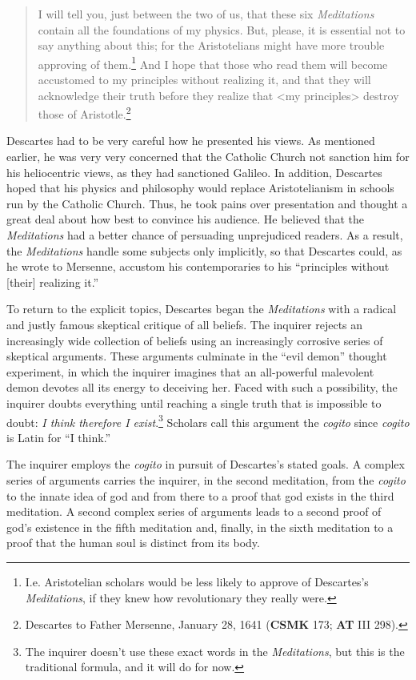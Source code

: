 \begin{quote}
    I will tell you, just between the two of us, that these six \textit{Meditations} contain all the foundations of my physics. But, please, it is essential not to say anything about this; for the Aristotelians might have more trouble approving of them.\footnote{I.e. Aristotelian scholars would be less likely to approve of Descartes's \textit{Meditations}, if they knew how revolutionary they really were.} And I hope that those who read them will become accustomed to my principles without realizing it, and that they will acknowledge their truth before they realize that <my principles> destroy those of Aristotle.\footnote{Descartes to Father Mersenne, January 28, 1641 (\textbf{CSMK} 173; \textbf{AT} III 298).}
\end{quote}

Descartes had to be very careful how he presented his views. As mentioned earlier, he was very very concerned that the Catholic Church not sanction him for his heliocentric views, as they had sanctioned Galileo. In addition, Descartes hoped that his physics and philosophy would replace Aristotelianism in schools run by the Catholic Church. Thus, he took pains over presentation and thought a great deal about how best to convince his audience. He believed that the \textit{Meditations} had a better chance of persuading unprejudiced readers. As a result, the \textit{Meditations} handle some subjects only implicitly, so that Descartes could, as he wrote to Mersenne, accustom his contemporaries to his ``principles without [their] realizing it.''

To return to the explicit topics, Descartes began the \textit{Meditations} with a radical and justly famous skeptical critique of all beliefs. The inquirer rejects an increasingly wide collection of beliefs using an increasingly corrosive series of skeptical arguments. These arguments culminate in the ``evil demon'' thought experiment, in which the inquirer imagines that an all-powerful malevolent demon devotes all its energy to deceiving her. Faced with such a possibility, the inquirer doubts everything until reaching a single truth that is impossible to doubt: \textit{I think therefore I exist}.\footnote{The inquirer doesn't use these exact words in the \textit{Meditations}, but this is the traditional formula, and it will do for now.} Scholars call this argument the \textit{cogito} since \textit{cogito} is Latin for ``I think.''

The inquirer employs the \textit{cogito} in pursuit of Descartes's stated goals. A complex series of arguments carries the inquirer, in the second meditation, from the \textit{cogito} to the innate idea of god and from there to a proof that god exists in the third meditation. A second complex series of arguments leads to a second proof of god's existence in the fifth meditation and, finally, in the sixth meditation to a proof that the human soul is distinct from its body.

